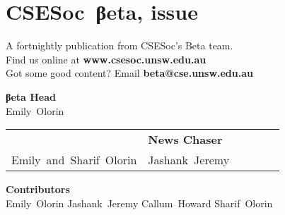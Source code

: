 \documentclass[twoside]{article}
\date{9th May 2016}
\makeatletter
\gdef\the@issue{119}
\makeatother
\begin{document}

\newpage
\maketitle\thispagestyle{mag}
\vspace*{-2em}\section*{CSE{}Soc~βeta, issue \makeatletter\the@issue}
\begin{multicols}{2}\begingroup\raggedcolumns
\begin{center}
A fortnightly publication from CSESoc's Beta team.\\
Find us online at \textbf{www.csesoc.unsw.edu.au}\\
Got some good content? Email \textbf{beta@cse.unsw.edu.au}\\
\par{\bf\sffamily βeta Head}\\ Emily~Olorin
\par\begin{tabular}{>{\raggedleft}p{0.5\linewidth}>{\raggedright}p{0.5\linewidth}}
{\bf\sffamily Puzzle Wrangler} & {\bf\sffamily News Chaser}\tabularnewline
Emily~and~Sharif~Olorin & Jashank~Jeremy\tabularnewline
\end{tabular}
\par{\bf\sffamily Contributors}\\
  Emily~Olorin\hsp{}
  Jashank~Jeremy\hsp{}
  Callum~Howard\hsp{}
  Sharif~Olorin\hsp{}
\end{center}
\columnbreak\malcontents\vfill\endgroup
\end{multicols}\LRmulticolcolumns
\vspace*{-4em}\begin{multicols}{2}


\end{multicols}
\end{document}
